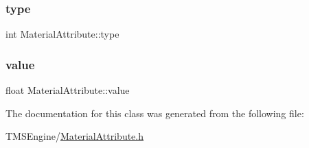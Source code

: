 \mbox{\label{class_material_attribute_af4f42692f645b1d01c3605a95c4eb42d}} 
\subsubsection{\texorpdfstring{type}{type}}
{\footnotesize\ttfamily int Material\+Attribute\+::type}

\mbox{\label{class_material_attribute_aa9dd014cb716d0270347167bee75cc75}} 
\subsubsection{\texorpdfstring{value}{value}}
{\footnotesize\ttfamily float Material\+Attribute\+::value}



The documentation for this class was generated from the following file\+:\begin{DoxyCompactItemize}
\item 
T\+M\+S\+Engine/\hyperlink{_material_attribute_8h}{Material\+Attribute.\+h}\end{DoxyCompactItemize}

